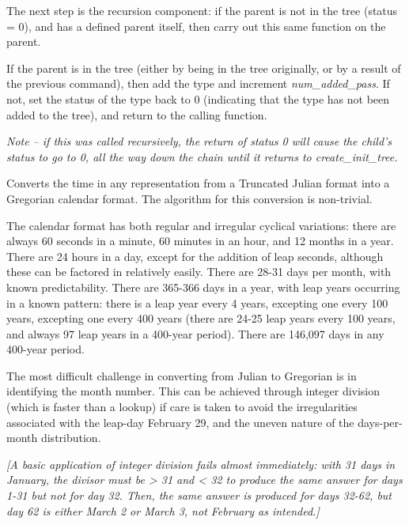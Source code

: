 {\begin{enumerate}
{\begin{enumerate}
The next step is the recursion component:  if the parent is not in the
tree (status = 0), and has a defined parent itself, then carry out this
same function on the parent.

If the parent is in the tree (either by being in the tree originally, or
by a result of the previous command), then add the type and increment
\textit{num\_added\_pass}.  If not, set the status of the type back to
0 (indicating that the type has not been added to the tree), and return
to the calling function.

{\itshape
Note -- if this was called recursively, the return of status 0 will
cause the child's status to go to 0, all the way down
the chain until it returns to create\_init\_tree. }

\label{ref:calculatecalendarvalues}Converts the time in any
representation from a Truncated Julian format into a Gregorian calendar
format.  The algorithm for this conversion is non-trivial.

The calendar format has both regular and irregular cyclical variations:
there are always 60 seconds in a minute, 60 minutes in an hour, and 12
months in a year.  There are 24 hours in a day, except for the addition
of leap seconds, although these can be factored in relatively easily.
There are 28-31 days per month, with known predictability.  There are
365-366 days in a year, with leap years occurring in a known pattern: there is
a leap year every 4 years, excepting one every 100 years, excepting one every
400
years (there are 24-25 leap years every 100 years, and always 97 leap
years in a 400-year period).  There are 146,097 days in any 400-year
period.

The most difficult challenge in converting from Julian to Gregorian is
in identifying the month number.  This can be achieved through integer
division (which is faster than a lookup) if care is taken to avoid the
irregularities associated with the leap-day February 29, and the uneven
nature of the days-per-month distribution.

{\itshape
[A basic application of integer division fails almost immediately: with
31 days in January, the divisor must be {\textgreater} 31 and
{\textless} 32 to produce the same answer for days 1-31 but not for day
32.  Then, the same answer is produced for days 32-62, but day 62 is
either March 2 or March 3, not February as intended.]}


\end{enumerate}}
\end{enumerate}}
